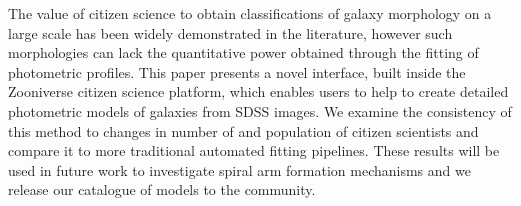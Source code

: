 \documentclass[../main.tex]{subfiles}
\begin{document}
The value of citizen science to obtain classifications of galaxy morphology on a large scale has been widely demonstrated in the literature, however such morphologies can lack the quantitative power obtained through the fitting of photometric profiles. This paper presents a novel interface, built inside the Zooniverse citizen science platform, which enables users to help to create detailed photometric models of galaxies from SDSS images. We examine the consistency of this method to changes in number of and population of citizen scientists and compare it to more traditional automated fitting pipelines. These results will be used in future work to investigate spiral arm formation mechanisms and we release our catalogue of models to the community.
\end{document}
